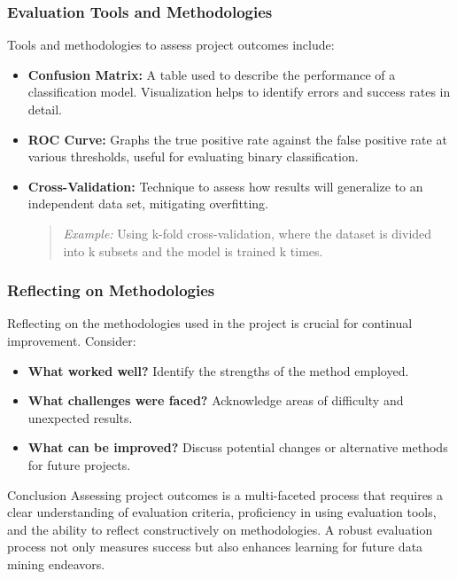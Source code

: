 \documentclass[aspectratio=169]{beamer}
\begin{document}
\begin{frame}[fragile]
    \frametitle{Evaluation Tools and Methodologies}
    Tools and methodologies to assess project outcomes include:

    \begin{itemize}
        \item \textbf{Confusion Matrix:} A table used to describe the performance of a classification model. Visualization helps to identify errors and success rates in detail.
        
        \item \textbf{ROC Curve:} Graphs the true positive rate against the false positive rate at various thresholds, useful for evaluating binary classification.
        
        \item \textbf{Cross-Validation:} Technique to assess how results will generalize to an independent data set, mitigating overfitting.
        \begin{quote}
        \textit{Example:} Using k-fold cross-validation, where the dataset is divided into k subsets and the model is trained k times.
        \end{quote}
    \end{itemize}
\end{frame}

\begin{frame}[fragile]
    \frametitle{Reflecting on Methodologies}
    Reflecting on the methodologies used in the project is crucial for continual improvement. Consider:

    \begin{itemize}
        \item \textbf{What worked well?} Identify the strengths of the method employed.
        \item \textbf{What challenges were faced?} Acknowledge areas of difficulty and unexpected results.
        \item \textbf{What can be improved?} Discuss potential changes or alternative methods for future projects.
    \end{itemize}

    \begin{block}{Conclusion}
        Assessing project outcomes is a multi-faceted process that requires a clear understanding of evaluation criteria, proficiency in using evaluation tools, and the ability to reflect constructively on methodologies. A robust evaluation process not only measures success but also enhances learning for future data mining endeavors.
    \end{block}
\end{frame}
\end{document}
